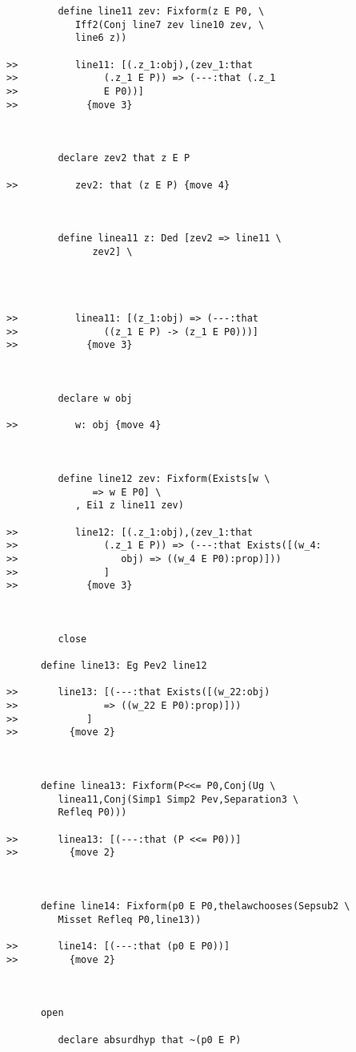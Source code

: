\documentclass[12pt]{article}
\begin{document}
\begin{verbatim}
         define line11 zev: Fixform(z E P0, \
            Iff2(Conj line7 zev line10 zev, \
            line6 z))

>>          line11: [(.z_1:obj),(zev_1:that
>>               (.z_1 E P)) => (---:that (.z_1
>>               E P0))]
>>            {move 3}



         declare zev2 that z E P

>>          zev2: that (z E P) {move 4}



         define linea11 z: Ded [zev2 => line11 \
               zev2] \
            



>>          linea11: [(z_1:obj) => (---:that
>>               ((z_1 E P) -> (z_1 E P0)))]
>>            {move 3}



         declare w obj

>>          w: obj {move 4}



         define line12 zev: Fixform(Exists[w \
               => w E P0] \
            , Ei1 z line11 zev)

>>          line12: [(.z_1:obj),(zev_1:that
>>               (.z_1 E P)) => (---:that Exists([(w_4:
>>                  obj) => ((w_4 E P0):prop)]))
>>               ]
>>            {move 3}



         close

      define line13: Eg Pev2 line12

>>       line13: [(---:that Exists([(w_22:obj)
>>               => ((w_22 E P0):prop)]))
>>            ]
>>         {move 2}



      define linea13: Fixform(P<<= P0,Conj(Ug \
         linea11,Conj(Simp1 Simp2 Pev,Separation3 \
         Refleq P0)))

>>       linea13: [(---:that (P <<= P0))]
>>         {move 2}



      define line14: Fixform(p0 E P0,thelawchooses(Sepsub2 \
         Misset Refleq P0,line13))

>>       line14: [(---:that (p0 E P0))]
>>         {move 2}



      open

         declare absurdhyp that ~(p0 E P)



\end{verbatim}
\end{document}
